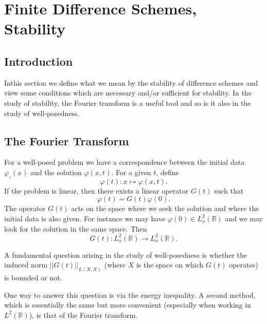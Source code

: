 
\chapter{Finite Difference Schemes, Stability}\label{chap6}

\section{Introduction}\label{chap6:sec6.1}

In\pageoriginale this section we define what we mean by the stability
of difference schemes and view some conditions which are necessary
and/or sufficient for stability. In the study of stability, the
Fourier transform is a useful tool and so is it also in the study of
well-posedness.

\section{The Fourier Transform}\label{chap6:sec6.2}

For a well-posed problem we have a correspondence between the initial
data $\varphi_\circ(x)$ and the solution $\varphi(x,t)$. For a given
$t$, define
\begin{equation*}
\varphi(t) : x \mapsto \varphi (x,t).
\tag{6.1}\label{eq6.1}
\end{equation*}
If the problem is linear, then there exists a linear operator $G(t)$
such that 
\begin{equation*}
\varphi(t) = G(t) \varphi (0). \tag{6.2}\label{eq6.2}
\end{equation*}
The operator $G(t)$ acts on the space where we seek the solution and
where the initial data is also given. For instance we may have
$\varphi(0) \in L^2 _x(\mathbb{R})$ and we may look for the solution
in the same space. Then
\begin{equation*}
G(t): L^2_x (\mathbb{R}) \to L^2_x(\mathbb{R}). \tag{6.3}\label{eq6.3}
\end{equation*}

A fundamental question arising in the study of well-posedness is
whether the induced norm $||G(t)||_{L(X,X)}$ (where $X$ is the space
on which $G(t)$ operates) is bounded or not.

One way to answer this question is via the energy inequality. A second
method, which is essentially the same but more convenient (especially
when working in $L^2 (\mathbb{R})$), is that of the Fourier transform.

